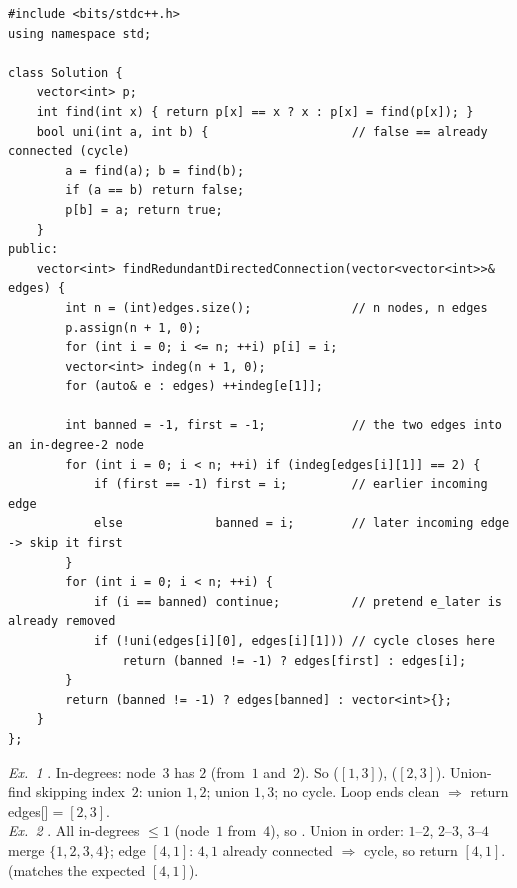 \begin{lstlisting}[caption={Redundant Connection II -- in-degree scan + union-find with one edge banned (LeetCode 685)}, label={lst:c25-rc2}]
#include <bits/stdc++.h>
using namespace std;

class Solution {
    vector<int> p;
    int find(int x) { return p[x] == x ? x : p[x] = find(p[x]); }
    bool uni(int a, int b) {                    // false == already connected (cycle)
        a = find(a); b = find(b);
        if (a == b) return false;
        p[b] = a; return true;
    }
public:
    vector<int> findRedundantDirectedConnection(vector<vector<int>>& edges) {
        int n = (int)edges.size();              // n nodes, n edges
        p.assign(n + 1, 0);
        for (int i = 0; i <= n; ++i) p[i] = i;
        vector<int> indeg(n + 1, 0);
        for (auto& e : edges) ++indeg[e[1]];

        int banned = -1, first = -1;            // the two edges into an in-degree-2 node
        for (int i = 0; i < n; ++i) if (indeg[edges[i][1]] == 2) {
            if (first == -1) first = i;         // earlier incoming edge
            else             banned = i;        // later incoming edge -> skip it first
        }
        for (int i = 0; i < n; ++i) {
            if (i == banned) continue;          // pretend e_later is already removed
            if (!uni(edges[i][0], edges[i][1])) // cycle closes here
                return (banned != -1) ? edges[first] : edges[i];
        }
        return (banned != -1) ? edges[banned] : vector<int>{};
    }
};
\end{lstlisting}

\begin{tracebox}
\emph{Ex.~1} . In-degrees: node~$3$ has $2$ (from~$1$ and~$2$). So
 ($[1,3]$),  ($[2,3]$). Union-find skipping index~$2$: union $1,2$;
union $1,3$; no cycle. Loop ends clean $\Rightarrow$ return edges[]$=[2,3]$. \checkmark\\
\emph{Ex.~2} . All in-degrees $\le1$ (node~$1$ from~$4$),
so . Union in order: $1\text{–}2$, $2\text{–}3$, $3\text{–}4$ merge $\{1,2,3,4\}$;
edge $[4,1]$: $4,1$ already connected $\Rightarrow$ cycle,  so return $[4,1]$.
\checkmark (matches the expected $[4,1]$).
\end{tracebox}


